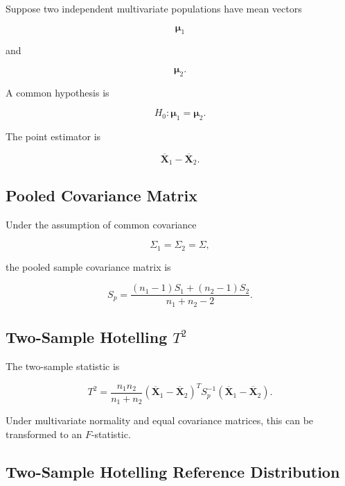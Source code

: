 Suppose two independent multivariate populations have mean vectors

\[
\boldsymbol{\mu}_1
\]

and

\[
\boldsymbol{\mu}_2.
\]

A common hypothesis is

\[
\boxed{
H_0:
\boldsymbol{\mu}_1
=
\boldsymbol{\mu}_2.
}
\]

The point estimator is

\[
\boxed{
\overline{\mathbf{X}}_1
-
\overline{\mathbf{X}}_2.
}
\]

\subsection{Pooled Covariance Matrix}
\label{subsec:multivariate-pooled-covariance}

Under the assumption of common covariance

\[
\Sigma_1=\Sigma_2=\Sigma,
\]

the pooled sample covariance matrix is

\[
\boxed{
S_p
=
\frac{
(n_1-1)S_1
+
(n_2-1)S_2
}{
n_1+n_2-2
}.
}
\]

\subsection{Two-Sample Hotelling \(T^2\)}
\label{subsec:two-sample-hotelling}

The two-sample statistic is

\[
\boxed{
T^2
=
\frac{
n_1n_2
}{
n_1+n_2
}
(
\overline{\mathbf{X}}_1
-
\overline{\mathbf{X}}_2
)^T
S_p^{-1}
(
\overline{\mathbf{X}}_1
-
\overline{\mathbf{X}}_2
).
}
\]

Under multivariate normality and equal covariance matrices, this can be
transformed to an \(F\)-statistic.

\subsection{Two-Sample Hotelling Reference Distribution}
\label{subsec:two-sample-hotelling-f}

